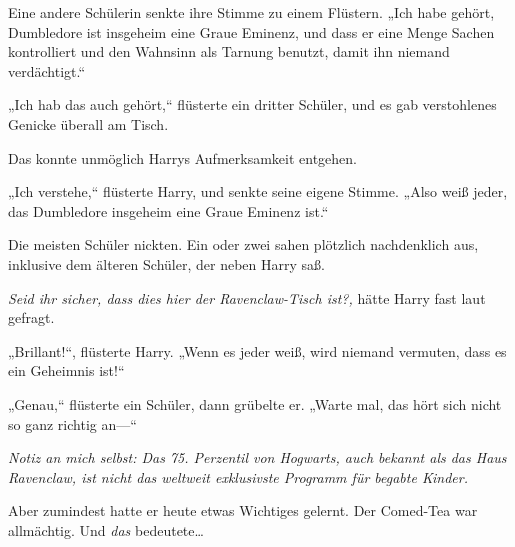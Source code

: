 Eine andere Schülerin senkte ihre Stimme zu einem Flüstern. „Ich habe gehört, Dumbledore ist insgeheim eine Graue Eminenz, und dass er eine Menge Sachen kontrolliert und den Wahnsinn als Tarnung benutzt, damit ihn niemand verdächtigt.“

„Ich hab das auch gehört,“ flüsterte ein dritter Schüler, und es gab verstohlenes Genicke überall am Tisch.

Das konnte unmöglich Harrys Aufmerksamkeit entgehen.

„Ich verstehe,“ flüsterte Harry, und senkte seine eigene Stimme. „Also weiß jeder, das Dumbledore insgeheim eine Graue Eminenz ist.“

Die meisten Schüler nickten. Ein oder zwei sahen plötzlich nachdenklich aus, inklusive dem älteren Schüler, der neben Harry saß.

\emph{Seid ihr sicher, dass dies hier der Ravenclaw-Tisch ist?,} hätte Harry fast laut gefragt.

„Brillant!“, flüsterte Harry. „Wenn es jeder weiß, wird niemand vermuten, dass es ein Geheimnis ist!“

„Genau,“ flüsterte ein Schüler, dann grübelte er. „Warte mal, das hört sich nicht so ganz richtig an—“

\emph{Notiz an mich selbst: Das 75. Perzentil von Hogwarts, auch bekannt als das Haus Ravenclaw, ist nicht das weltweit exklusivste Programm für begabte Kinder.}

Aber zumindest hatte er heute etwas Wichtiges gelernt. Der Comed-Tea war allmächtig. Und \emph{das} bedeutete…

